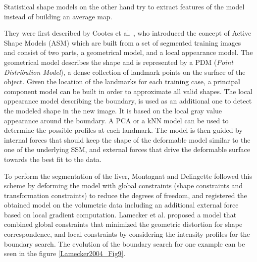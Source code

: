 Statistical shape models on the other hand try to extract features of
the model instead of building an average map.

They were first described by Cootes et al. \cite{Cootes1995}, 
who introduced the concept of Active Shape Models (ASM) which
are built from a set of segmented training images and consist of two
parts, a geometrical model, and a local appearance model. The
geometrical model describes the shape and is represented by a PDM
(\emph{Point Distribution Model}), a dense collection of landmark points
on the surface of the object. Given the location of the landmarks for
each training case, a principal component model can be built in order to
approximate all valid shapes. The local appearance model describing the
boundary, is used as an additional one to detect the modeled shape in
the new image. It is based on the local gray value appearance around the
boundary. A PCA or a kNN model can be used to determine the possible
profiles at each landmark. The model is then guided by internal
forces that should keep the shape of the deformable model similar to the
one of the underlying SSM, and external forces that drive the deformable
surface towards the best fit to the data.

To perform the segmentation of the liver, Montagnat and Delingette \cite{Montagnat1997} followed 
this scheme by deforming the model with
global constraints (shape constraints and transformation constraints) to
reduce the degrees of freedom, and registered the obtained model on the
volumetric data including an additional external force based on local
gradient computation.
Lamecker et al. \cite{Lamecker2004} proposed a model that combined global constraints that
minimized the geometric distortion for shape correspondence, and local
constraints by considering the intensity profiles for the boundary
search. The evolution of the boundary search for one example can be seen in the figure \ref{Lamecker2004_Fig9}.

